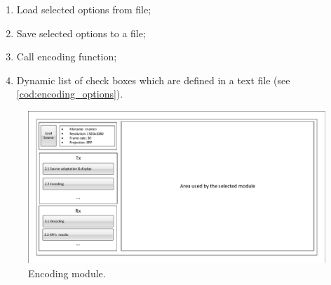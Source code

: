 \documentclass{article}
\begin{document}
\begin{enumerate}
    \item Load selected options from file;
    
    \item Save selected options to a file; 
    
    \item Call encoding function;
    
    \item Dynamic list of check boxes which are defined in a text file (see \cref{cod:encoding_options}). 
\end{enumerate}

\begin{figure}[htbp]
    \centering
    \includegraphics[page=3,width=1\textwidth]{Drawings.pdf}
    \caption{Encoding module.}
    \label{fig:encoding_module}
\end{figure}



\end{document}
